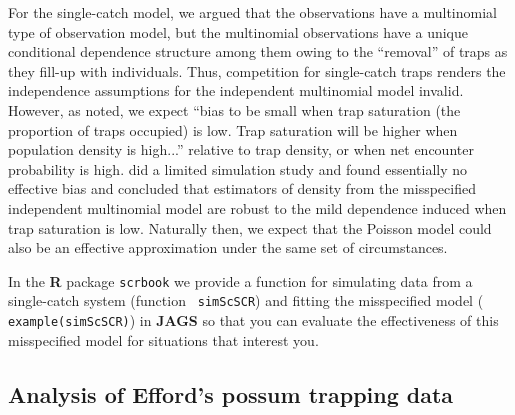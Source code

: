 For the single-catch model, we argued that the observations  
have a multinomial type of observation model, but the
multinomial observations have a unique conditional dependence
structure among them owing to the ``removal'' of traps as they fill-up
with individuals. 
Thus, 
competition for single-catch traps renders the independence
assumptions for the independent multinomial model invalid.  However, as
\citet{efford_etal:2009euring} noted, we expect ``bias to be small
when trap saturation (the proportion of traps occupied) is low.  Trap
saturation will be higher when population density is high...''
relative to trap density, or when net encounter probability is high.
\citet{efford_etal:2009euring} did a limited simulation study and found essentially no
effective bias and concluded that estimators of density from the
misspecified independent multinomial model are robust to the mild
dependence induced when trap saturation is low.  Naturally then, we
expect that the
Poisson model could also be an effective approximation under the same set
of circumstances.

In the {\bf R} package \mbox{\tt scrbook} we provide a function for
simulating data from a single-catch system (function \mbox{\tt
  simScSCR}) and fitting the misspecified model (\mbox{\tt
  example(simScSCR)}) in {\bf JAGS} so that you can 
evaluate the effectiveness of this misspecified model for 
situations that interest you.


\subsection{Analysis of Efford's possum trapping data}

